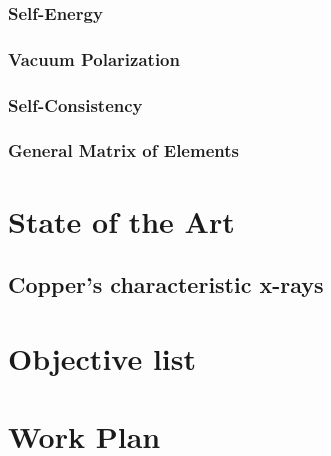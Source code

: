 \subsubsection{Self-Energy}
\subsubsection{Vacuum Polarization}


\subsubsection{Self-Consistency}


\subsubsection{General Matrix of Elements}



\section{State of the Art}


\subsection{Copper's characteristic x-rays}

\section{Objective list}

\section{Work Plan}
